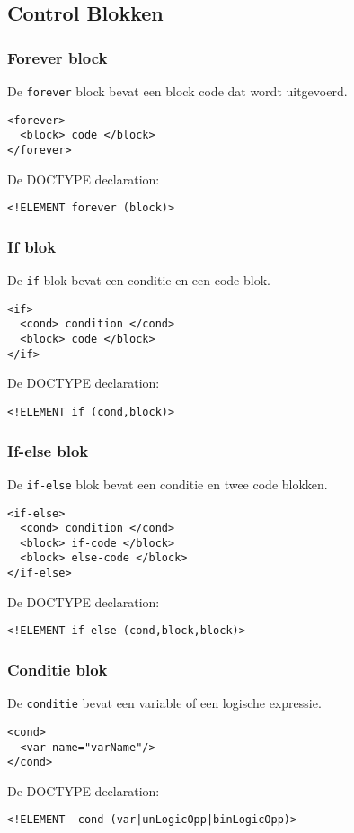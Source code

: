 \documentclass[]{article}
\begin{document}
\subsection{Control Blokken}
\subsubsection{Forever block}
De \texttt{forever} block bevat een block code dat wordt uitgevoerd.
\lstset{language=XML}
\begin{lstlisting}
<forever>
  <block> code </block>
</forever>
\end{lstlisting}
De DOCTYPE declaration: 
\lstset{language=XML}
\begin{lstlisting}
<!ELEMENT forever (block)>
\end{lstlisting}
\subsubsection{If blok}
De \texttt{if} blok bevat een conditie en een code blok.
\lstset{language=XML}
\begin{lstlisting}
<if>
  <cond> condition </cond>
  <block> code </block>
</if>
\end{lstlisting}
De DOCTYPE declaration: 
\lstset{language=XML}
\begin{lstlisting}
<!ELEMENT if (cond,block)>
\end{lstlisting}
\subsubsection{If-else blok}
De \texttt{if-else} blok bevat een conditie en twee code blokken.
\lstset{language=XML}
\begin{lstlisting}
<if-else>
  <cond> condition </cond>
  <block> if-code </block>
  <block> else-code </block>
</if-else>
\end{lstlisting}
De DOCTYPE declaration: 
\lstset{language=XML}
\begin{lstlisting}
<!ELEMENT if-else (cond,block,block)>
\end{lstlisting}
\subsubsection{Conditie blok}
De \texttt{conditie} bevat een variable of een logische expressie.
\lstset{language=XML}
\begin{lstlisting}
<cond>
  <var name="varName"/>
</cond>
\end{lstlisting}
De DOCTYPE declaration: 
\lstset{language=XML}
\begin{lstlisting}
<!ELEMENT  cond (var|unLogicOpp|binLogicOpp)>
\end{lstlisting}
\end{document}
